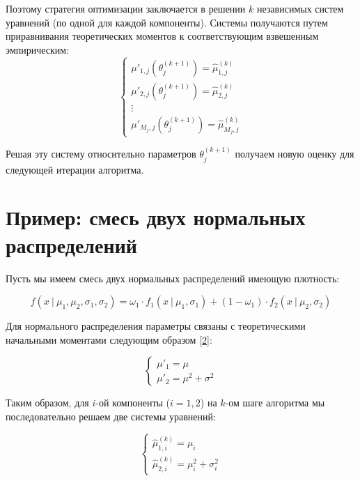 \documentclass[14pt, a4paper, oneside]{memoir}
\begin{document}
Поэтому стратегия оптимизации заключается в решении $k$ независимых систем уравнений (по одной для каждой компоненты). Системы получаются путем приравнивания теоретических моментов к соответствующим взвешенным эмпирическим:
\[\begin{cases} \mu'_{1, j}(\theta_j^{(k+1)}) = \hat{\mu}^{(k)}_{1,j} \\ \mu'_{2, j}(\theta_j^{(k+1)}) = \hat{\mu}^{(k)}_{2,j} \\ \vdots \\ \mu'_{M_j, j}(\theta_j^{(k+1)}) = \hat{\mu}^{(k)}_{M_j,j}\end{cases}\]

Решая эту систему относительно параметров $\theta_j^{(k+1)}$ получаем новую оценку для следующей итерации алгоритма.


\section{Пример: смесь двух нормальных распределений}

Пусть мы имеем смесь двух нормальных распределений имеющую плотность:

\[f(x ~|~ \mu_1, \mu_2, \sigma_1, \sigma_2) = \omega_1 \cdot f_1(x~|~ \mu_1, \sigma_1) + (1 - \omega_1) \cdot f_2(x~|~ \mu_2, \sigma_2)\]

Для нормального распределения параметры связаны с теоретическими начальными моментами следующим образом \href{https://faculty.washington.edu/yenchic/20A_stat512/Lec6_MLE.pdf}{[2]}:

\[\begin{cases} \mu'_1 = \mu \\  \mu'_2 = \mu^2 + \sigma^2 \end{cases}\]


Таким образом, для $i$-ой компоненты ($i = 1,2$) на $k$-ом шаге алгоритма мы последовательно решаем две системы уравнений:

\[\begin{cases} \hat{\mu}^{(k)}_{1, i} = \mu_i \\  \hat{\mu}^{(k)}_{2, i} = \mu_i^2 + \sigma_i^2 \end{cases}\]

\printbibliography
\end{document}

